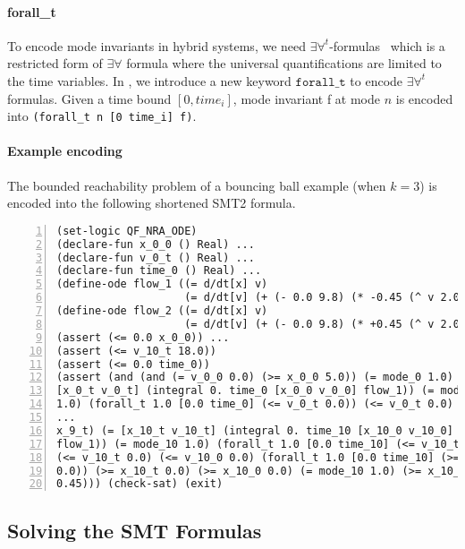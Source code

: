 \paragraph{forall\_t} To encode mode invariants in hybrid systems, we
need $\exists\forall^t$-formulas~\cite{DBLP:conf/fmcad/GaoKC13} which
is a restricted form of $\exists\forall$ formula where the universal
quantifications are limited to the time variables. In \drh{}, we
introduce a new keyword $\texttt{forall\_t}$ to encode
$\exists\forall^t$ formulas. Given a time bound $[0, time_i]$, mode
invariant f at mode $n$ is encoded into \texttt{(forall\_t n [0
  time\_i] f)}.

\paragraph{Example encoding} The bounded reachability problem of a
bouncing ball example (when $k = 3$) is encoded into the following
shortened SMT2 formula.
\begin{Verbatim}[fontfamily=courier, frame=single, framesep=1mm,  numbers=left, fontsize=\scriptsize]
(set-logic QF_NRA_ODE)
(declare-fun x_0_0 () Real) ...
(declare-fun v_0_t () Real) ...
(declare-fun time_0 () Real) ...
(define-ode flow_1 ((= d/dt[x] v)
                    (= d/dt[v] (+ (- 0.0 9.8) (* -0.45 (^ v 2.0))))))
(define-ode flow_2 ((= d/dt[x] v)
                    (= d/dt[v] (+ (- 0.0 9.8) (* +0.45 (^ v 2.0))))))
(assert (<= 0.0 x_0_0)) ...
(assert (<= v_10_t 18.0))
(assert (<= 0.0 time_0))
(assert (and (and (= v_0_0 0.0) (>= x_0_0 5.0)) (= mode_0 1.0) (=
[x_0_t v_0_t] (integral 0. time_0 [x_0_0 v_0_0] flow_1)) (= mode_0
1.0) (forall_t 1.0 [0.0 time_0] (<= v_0_t 0.0)) (<= v_0_t 0.0) (<=
...
x_9_t) (= [x_10_t v_10_t] (integral 0. time_10 [x_10_0 v_10_0]
flow_1)) (= mode_10 1.0) (forall_t 1.0 [0.0 time_10] (<= v_10_t 0.0))
(<= v_10_t 0.0) (<= v_10_0 0.0) (forall_t 1.0 [0.0 time_10] (>= x_10_t
0.0)) (>= x_10_t 0.0) (>= x_10_0 0.0) (= mode_10 1.0) (>= x_10_t
0.45))) (check-sat) (exit)
\end{Verbatim}

\subsection{Solving the SMT Formulas}


